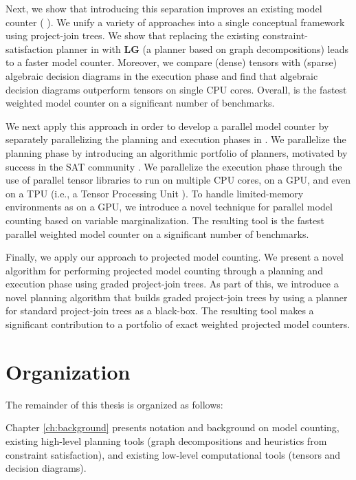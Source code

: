 Next, we show that introducing this separation improves an existing model counter ( \cite{DPV20,phan2019weighted}). We unify a variety of approaches into a single conceptual framework using project-join trees. We show that replacing the existing constraint-satisfaction planner in  with \textbf{LG} (a planner based on graph decompositions) leads to a faster model counter. Moreover, we compare (dense) tensors with (sparse) algebraic decision diagrams in the execution phase and find that algebraic decision diagrams outperform tensors on single CPU cores. Overall,  is the fastest weighted model counter on a significant number of benchmarks.

We next apply this approach in order to develop a parallel model counter by separately parallelizing the planning and execution phases in . We parallelize the planning phase by introducing an algorithmic portfolio of planners, motivated by success in the SAT community \cite{XHHL08}. We parallelize the execution phase through the use of parallel tensor libraries to run on multiple CPU cores, on a GPU, and even on a TPU (i.e., a Tensor Processing Unit \cite{JYPPABBBBB17}). To handle limited-memory environments as on a GPU, we introduce a novel technique for parallel model counting based on variable marginalization. 
The resulting tool  is the fastest parallel weighted model counter on a significant number of benchmarks.

Finally, we apply our approach to projected model counting. We present a novel algorithm for performing projected model counting through a planning and execution phase using graded project-join trees. As part of this, we introduce a novel planning algorithm that builds graded project-join trees by using a planner for standard project-join trees as a black-box. The resulting tool  makes a significant contribution to a portfolio of exact weighted projected model counters.

\section{Organization}
The remainder of this thesis is organized as follows:

Chapter \ref{ch:background} presents notation and background on model counting, existing high-level planning tools (graph decompositions and heuristics from constraint satisfaction), and existing low-level computational tools (tensors and decision diagrams). 


